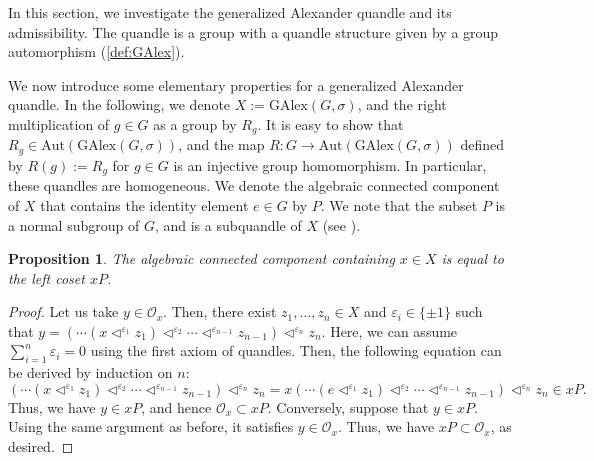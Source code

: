 \documentclass[dvipdfmx,12pt]{amsart}
\theoremstyle{plain}
\newtheorem{prop}[thm]{Proposition}
\theoremstyle{definition}
\newcommand{\qop}{\triangleleft}
\newcommand{\Aut}{\mathrm{Aut}}
\newcommand{\GAlex}{\mathrm{GAlex}}
\newcommand{\OO}{\mathcal{O}}
\begin{document}
In this section, we investigate the generalized Alexander quandle and its admissibility.
The quandle is a group with a quandle structure given by a group automorphism (\cref{def:GAlex}). 

We now introduce some elementary properties for a generalized Alexander quandle.
In the following, we denote $X := \GAlex(G, \sigma)$, and the right multiplication of $g \in G$ as a group by $R_g$.
It is easy to show that $R_g \in \Aut(\GAlex(G, \sigma))$, and the map $R: G \to \Aut(\GAlex(G, \sigma))$ defined by $R(g) := R_g$ for $g \in G$ is an injective group homomorphism.
In particular, these quandles are homogeneous.
We denote the algebraic connected component of $X$ that contains the identity element $e \in G$ by $P$.
We note that the subset $P$ is a normal subgroup of $G$, and is a subquandle of $X$ (see \cite{Higashitani-2024-ClassificationGeneralizedAlexanderQuandlesa}).
\begin{prop}\label{prop:conn_GAlex}
  The algebraic connected component containing $x \in X$ is equal to the left coset $xP$.
\end{prop}
\begin{proof}
  Let us take $y \in \mathcal{O}_x$.
  Then, there exist $z_1, \dots, z_n \in X$ and $\varepsilon_i \in \{\pm 1\}$ such that 
  $y = ( \cdots (x \qop^{\varepsilon_1} z_1) \qop^{\varepsilon_2} \cdots \qop^{\varepsilon_{n-1}} z_{n-1}) \qop^{\varepsilon_n} z_n$.
  Here, we can assume $\sum_{i=1}^n \varepsilon_i = 0$ using the first axiom of quandles.
  Then, the following equation can be derived by induction on $n$:
  \begin{equation*}
    ( \cdots (x \qop^{\varepsilon_1} z_1) \qop^{\varepsilon_2} \cdots \qop^{\varepsilon_{n-1}} z_{n-1}) \qop^{\varepsilon_n} z_n
    = x ( \cdots (e \qop^{\varepsilon_1} z_1) \qop^{\varepsilon_2} \cdots \qop^{\varepsilon_{n-1}} z_{n-1}) \qop^{\varepsilon_n} z_n \in x P.
  \end{equation*}
  Thus, we have $y \in xP$, and hence $\OO_x \subset xP$.
  Conversely, suppose that $y \in xP$.
 Using the same argument as before,
  it satisfies $y \in \OO_x$.
  Thus, we have $xP \subset \OO_x$, as desired.
\end{proof}
\end{document}
